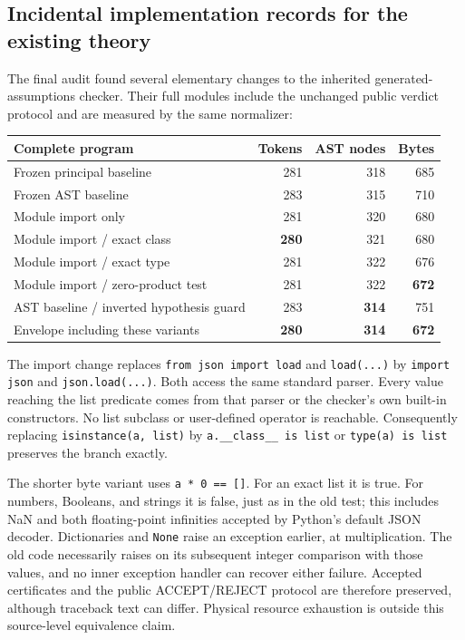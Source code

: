 \documentclass[11pt,letterpaper]{article}
\theoremstyle{definition}\newtheorem{definition}[theorem]{Definition}
\theoremstyle{remark}\newtheorem{remark}[theorem]{Remark}
\begin{document}
\subsection{Incidental implementation records for the existing theory}
\label{sec:incidental}

The final audit found several elementary changes to the inherited
generated-assumptions checker. Their full modules include the unchanged
public verdict protocol and are measured by the same normalizer:
\begin{center}\small
\begin{tabular}{lrrr}
\toprule
Complete program & Tokens & AST nodes & Bytes\\
\midrule
Frozen principal baseline &281&318&685\\
Frozen AST baseline &283&315&710\\
Module import only &281&320&680\\
Module import / exact class &\textbf{280}&321&680\\
Module import / exact type &281&322&676\\
Module import / zero-product test &281&322&\textbf{672}\\
AST baseline / inverted hypothesis guard &283&\textbf{314}&751\\
\midrule
Envelope including these variants &\textbf{280}&\textbf{314}&\textbf{672}\\
\bottomrule
\end{tabular}
\end{center}

The import change replaces \texttt{from json import load} and
\texttt{load(...)} by \texttt{import json} and \texttt{json.load(...)}.
Both access the same standard parser. Every value reaching the list
predicate comes from that parser or the checker's own built-in
constructors. No list subclass or user-defined operator is reachable.
Consequently replacing \texttt{isinstance(a, list)} by
\texttt{a.\_\_class\_\_ is list} or \texttt{type(a) is list}
preserves the branch exactly.

The shorter byte variant uses \texttt{a * 0 == []}. For an exact list it
is true. For numbers, Booleans, and strings it is false, just as in the
old test; this includes NaN and both floating-point infinities accepted
by Python's default JSON decoder. Dictionaries and \texttt{None} raise
an exception earlier, at multiplication. The old code necessarily raises
on its subsequent integer comparison with those values, and no inner
exception handler can recover either failure. Accepted certificates and
the public ACCEPT/REJECT protocol are therefore preserved, although
traceback text can differ. Physical resource exhaustion is outside
this source-level equivalence claim.
\end{document}
